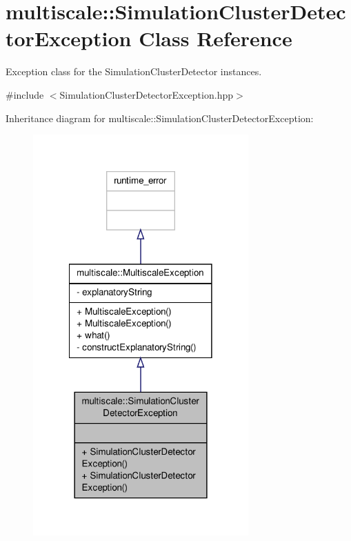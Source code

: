 \hypertarget{classmultiscale_1_1SimulationClusterDetectorException}{\section{multiscale\-:\-:Simulation\-Cluster\-Detector\-Exception Class Reference}
\label{classmultiscale_1_1SimulationClusterDetectorException}
}


Exception class for the Simulation\-Cluster\-Detector instances.  




{\ttfamily \#include $<$Simulation\-Cluster\-Detector\-Exception.\-hpp$>$}



Inheritance diagram for multiscale\-:\-:Simulation\-Cluster\-Detector\-Exception\-:\nopagebreak
\begin{figure}[H]
\begin{center}
\leavevmode
\includegraphics[width=234pt]{classmultiscale_1_1SimulationClusterDetectorException__inherit__graph}
\end{center}
\end{figure}


